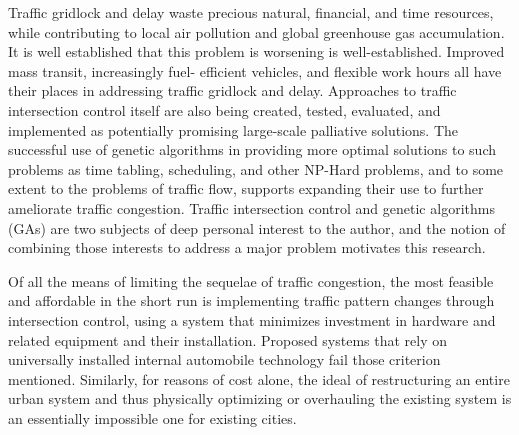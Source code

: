 Traffic gridlock and delay waste precious natural, financial, and time resources, while contributing to local air pollution and global greenhouse gas accumulation.  It is well established that this problem is worsening is well-established.  Improved mass transit, increasingly fuel- efficient vehicles, and flexible work hours all have their places in addressing traffic gridlock and delay.  Approaches to traffic intersection control itself are also being created, tested, evaluated, and implemented as potentially promising large-scale palliative solutions.  The successful use of genetic algorithms in providing more optimal solutions to such problems as time tabling, scheduling, and other NP-Hard problems, and to some extent to the problems of traffic flow, supports expanding their use to further ameliorate traffic congestion.  Traffic intersection control and genetic algorithms (GAs) are two subjects of deep personal interest to the author, and the notion of combining those interests to address a major problem motivates this research.  

Of all the means of limiting the sequelae of traffic congestion, the most feasible and affordable in the short run is implementing traffic pattern changes through intersection control, using a system that minimizes investment in hardware and related equipment and their installation. Proposed systems that rely on universally installed internal automobile technology fail those criterion mentioned. Similarly, for reasons of cost alone, the ideal of restructuring an entire urban system and thus physically optimizing or overhauling the existing system is an essentially impossible one for existing cities.
 
